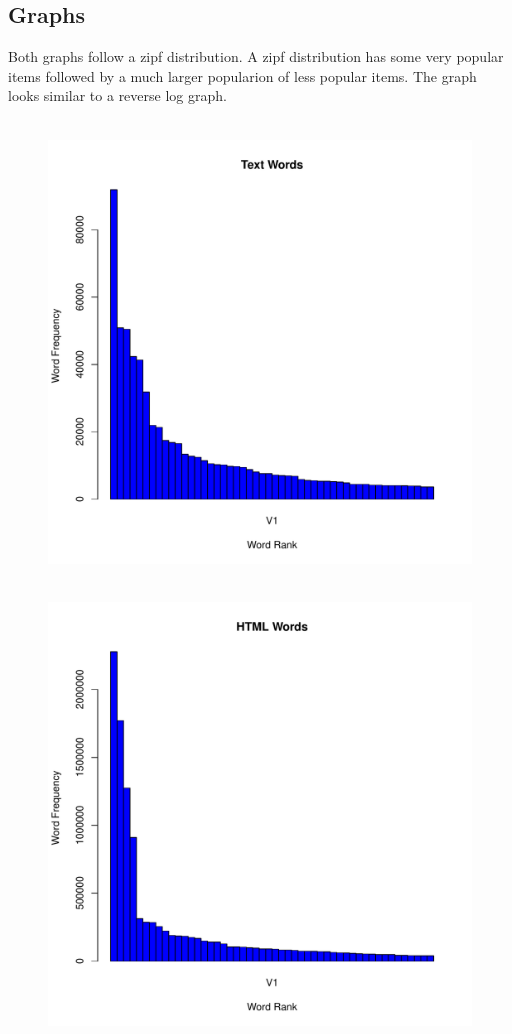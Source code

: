 \documentclass[12pt]{article}
\begin{document}
\subsection{Graphs}
Both graphs follow a zipf distribution.  A zipf distribution has some very popular items followed by a much larger popularion of less popular items.  The graph looks similar to a reverse log graph.

\begin{figure}[H]
    \centering
    \includegraphics[scale=0.7]{text.pdf}
\end{figure}

\begin{figure}[H]
    \centering
    \includegraphics[scale=0.7]{html.pdf}
\end{figure}

\printbibliography
\end{document}
